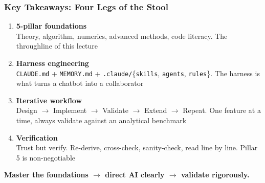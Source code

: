 \documentclass[10pt,english,aspectratio=169]{beamer}
\begin{document}
\begin{frame}
\frametitle{Key Takeaways: Four Legs of the Stool}

\begin{enumerate}
    \item \textbf{5-pillar foundations} \\
    Theory, algorithm, numerics, advanced methods, code literacy. The throughline of this lecture
    \vspace{0.15cm}
    \item \textbf{Harness engineering} \\
    \texttt{CLAUDE.md} + \texttt{MEMORY.md} + \texttt{.claude/}\{\texttt{skills}, \texttt{agents}, \texttt{rules}\}. The harness is what turns a chatbot into a collaborator
    \vspace{0.15cm}
    \item \textbf{Iterative workflow} \\
    Design $\to$ Implement $\to$ Validate $\to$ Extend $\to$ Repeat. One feature at a time, always validate against an analytical benchmark
    \vspace{0.15cm}
    \item \textbf{Verification} \\
    Trust but verify. Re-derive, cross-check, sanity-check, read line by line. Pillar 5 is non-negotiable
\end{enumerate}

\vspace{0.3cm}

\begin{center}
\textbf{Master the foundations $\to$ direct AI clearly $\to$ validate rigorously.}
\end{center}
\end{frame}
\end{document}
